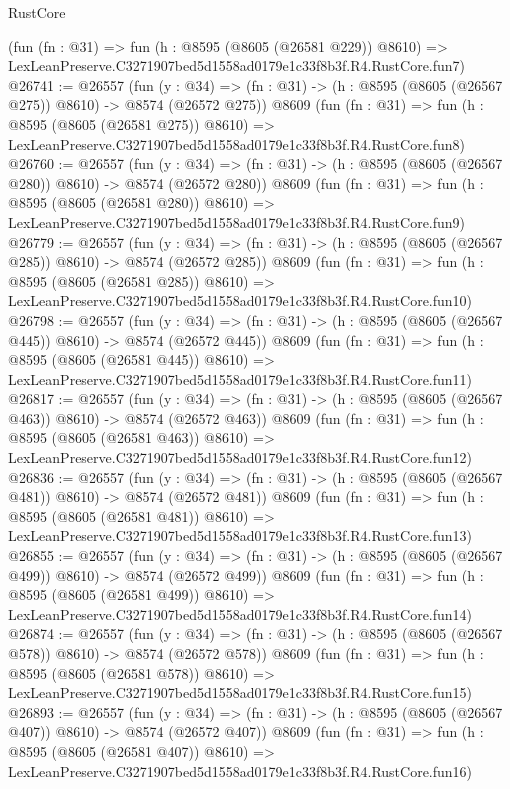 \begin{lexlean}{RustCore}
\begin{coremodule}
    (fun (fn : @31) =>
    fun (h : @8595 (@8605 (@26581 @229)) @8610) =>
    LexLeanPreserve.C3271907bed5d1558ad0179e1c33f8b3f.R4.RustCore.fun7)
@26741 := @26557
    (fun (y : @34) => (fn : @31) -> (h : @8595 (@8605 (@26567 @275)) @8610) -> @8574 (@26572 @275))
    @8609
    (fun (fn : @31) =>
    fun (h : @8595 (@8605 (@26581 @275)) @8610) =>
    LexLeanPreserve.C3271907bed5d1558ad0179e1c33f8b3f.R4.RustCore.fun8)
@26760 := @26557
    (fun (y : @34) => (fn : @31) -> (h : @8595 (@8605 (@26567 @280)) @8610) -> @8574 (@26572 @280))
    @8609
    (fun (fn : @31) =>
    fun (h : @8595 (@8605 (@26581 @280)) @8610) =>
    LexLeanPreserve.C3271907bed5d1558ad0179e1c33f8b3f.R4.RustCore.fun9)
@26779 := @26557
    (fun (y : @34) => (fn : @31) -> (h : @8595 (@8605 (@26567 @285)) @8610) -> @8574 (@26572 @285))
    @8609
    (fun (fn : @31) =>
    fun (h : @8595 (@8605 (@26581 @285)) @8610) =>
    LexLeanPreserve.C3271907bed5d1558ad0179e1c33f8b3f.R4.RustCore.fun10)
@26798 := @26557
    (fun (y : @34) => (fn : @31) -> (h : @8595 (@8605 (@26567 @445)) @8610) -> @8574 (@26572 @445))
    @8609
    (fun (fn : @31) =>
    fun (h : @8595 (@8605 (@26581 @445)) @8610) =>
    LexLeanPreserve.C3271907bed5d1558ad0179e1c33f8b3f.R4.RustCore.fun11)
@26817 := @26557
    (fun (y : @34) => (fn : @31) -> (h : @8595 (@8605 (@26567 @463)) @8610) -> @8574 (@26572 @463))
    @8609
    (fun (fn : @31) =>
    fun (h : @8595 (@8605 (@26581 @463)) @8610) =>
    LexLeanPreserve.C3271907bed5d1558ad0179e1c33f8b3f.R4.RustCore.fun12)
@26836 := @26557
    (fun (y : @34) => (fn : @31) -> (h : @8595 (@8605 (@26567 @481)) @8610) -> @8574 (@26572 @481))
    @8609
    (fun (fn : @31) =>
    fun (h : @8595 (@8605 (@26581 @481)) @8610) =>
    LexLeanPreserve.C3271907bed5d1558ad0179e1c33f8b3f.R4.RustCore.fun13)
@26855 := @26557
    (fun (y : @34) => (fn : @31) -> (h : @8595 (@8605 (@26567 @499)) @8610) -> @8574 (@26572 @499))
    @8609
    (fun (fn : @31) =>
    fun (h : @8595 (@8605 (@26581 @499)) @8610) =>
    LexLeanPreserve.C3271907bed5d1558ad0179e1c33f8b3f.R4.RustCore.fun14)
@26874 := @26557
    (fun (y : @34) => (fn : @31) -> (h : @8595 (@8605 (@26567 @578)) @8610) -> @8574 (@26572 @578))
    @8609
    (fun (fn : @31) =>
    fun (h : @8595 (@8605 (@26581 @578)) @8610) =>
    LexLeanPreserve.C3271907bed5d1558ad0179e1c33f8b3f.R4.RustCore.fun15)
@26893 := @26557
    (fun (y : @34) => (fn : @31) -> (h : @8595 (@8605 (@26567 @407)) @8610) -> @8574 (@26572 @407))
    @8609
    (fun (fn : @31) =>
    fun (h : @8595 (@8605 (@26581 @407)) @8610) =>
    LexLeanPreserve.C3271907bed5d1558ad0179e1c33f8b3f.R4.RustCore.fun16)

\end{coremodule}
\end{lexlean}

